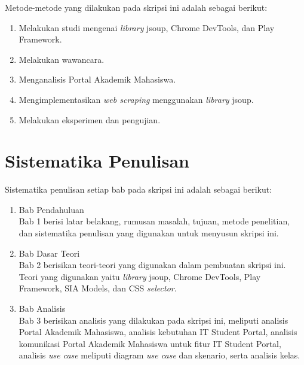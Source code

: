Metode-metode yang dilakukan pada skripsi ini adalah sebagai berikut:

\begin{enumerate}
	\item Melakukan studi mengenai \textit{library} jsoup, Chrome DevTools, dan Play Framework.
	\item Melakukan wawancara.
	\item Menganalisis Portal Akademik Mahasiswa.
	\item Mengimplementasikan \textit{web scraping} menggunakan \textit{library} jsoup.
	\item Melakukan eksperimen dan pengujian.
\end{enumerate}

\section{Sistematika Penulisan}
\label{sec:sistematika_penulisan}

Sistematika penulisan setiap bab pada skripsi ini adalah sebagai berikut:

\begin{enumerate}
  \item Bab Pendahuluan \\
  Bab 1 berisi latar belakang, rumusan masalah, tujuan, metode penelitian,
  dan sistematika penulisan yang digunakan untuk menyusun skripsi ini.
  \item Bab Dasar Teori \\
  Bab 2 berisikan teori-teori yang digunakan dalam pembuatan skripsi ini. Teori
  yang digunakan yaitu \textit{library} jsoup, Chrome DevTools, Play Framework, SIA Models, dan CSS \textit{selector}.
  \item Bab Analisis \\
  Bab 3 berisikan analisis yang dilakukan pada skripsi ini, meliputi analisis Portal Akademik Mahasiswa, analisis kebutuhan IT Student Portal, analisis komunikasi Portal Akademik Mahasiswa untuk fitur IT Student Portal, analisis \textit{use case} meliputi diagram \textsl{use case} dan skenario, serta analisis kelas. 
\end{enumerate}
